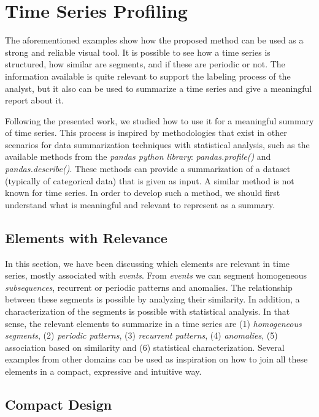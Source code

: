 {\section{Time Series Profiling}

The aforementioned examples show how the proposed method can be used as a strong and reliable visual tool. It is possible to see how a time series is structured, how similar are segments, and if these are periodic or not. The information available is quite relevant to support the labeling process of the analyst, but it also can be used to summarize a time series and give a meaningful report about it. 
\par
Following the presented work, we studied how to use it for a meaningful summary of time series. This process is inspired by methodologies that exist in other scenarios for data summarization techniques with statistical analysis, such as the available methods from the \textit{pandas python library}: \textit{pandas.profile()} and \textit{pandas.describe()}. These methods can provide a summarization of a dataset (typically of categorical data) that is given as input. A similar method is not known for time series. In order to develop such a method, we should first understand what is meaningful and relevant to represent as a summary.

\subsection{Elements with Relevance}

In this section, we have been discussing which elements are relevant in time series, mostly associated with \textit{events}. From \textit{events} we can segment homogeneous \textit{subsequences}, recurrent or periodic patterns and anomalies. The relationship between these segments is possible by analyzing their similarity. In addition, a characterization of the segments is possible with statistical analysis. In that sense, the relevant elements to summarize in a time series are (1) \textit{homogeneous segments}, (2) \textit{periodic patterns}, (3) \textit{recurrent patterns}, (4) \textit{anomalies}, (5) association based on similarity and (6) statistical characterization. Several examples from other domains can be used as inspiration on how to join all these elements in a compact, expressive and intuitive way.

\subsection{Compact Design}

}
